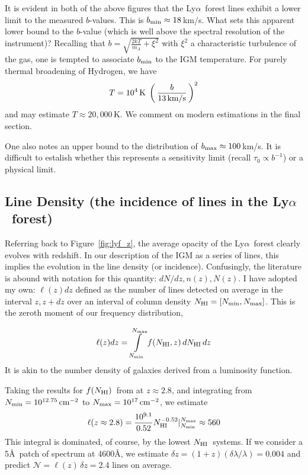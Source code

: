 \documentclass[graybox]{svmult}
\def\lya{Ly$\alpha$}
\def\ltp{\left ( \,}
\def\rtp{\, \right  ) }
\def\intl{\int\limits}
\newcommand{\mnhi}{N_{\rm HI}}
\newcommand{\nhi}{$\mnhi$}
\def\cm#1{\, {\rm cm^{#1}}}
\def\mfnhi{f(\mnhi)}
\def\fnhi{$\mfnhi$}
\begin{document}
It is evident in both of the above figures that the
\lya\ forest lines exhibit a lower limit to the 
measured $b$-values.  This is  $b_{\rm min} \approx 18$\,km/s.
What sets this apparent lower bound to the $b$-value (which is 
well above the spectral resolution of the instrument)?
Recalling that $b = \sqrt{\frac{2kT}{m_A} + \xi^2}$
with $\xi^2$ a characteristic turbulence of the gas,
one is tempted to associate $b_{\rm min}$ to the IGM temperature.
For purely thermal broadening of Hydrogen, we have
\begin{equation}
T = 10^4 \, {\rm K} \; \ltp \frac{b}{13 \, \rm km/s} \rtp^2
\end{equation}
and may estimate $T \approx 20,000$\,K.
We comment on modern estimations in the final section.

One also notes an upper bound to the distribution
of $b_{\rm max} \approx 100$\,km/s.
It is difficult to estalish whether this represents
a sensitivity limit (recall $\tau_0 \propto b^{-1}$)
or a physical limit.

\subsection{Line Density (the incidence of lines in the \lya\ forest)}
Referring back to Figure~\ref{fig:lyf_z}, the average 
opacity of the \lya\ forest clearly evolves with redshift.
In our description of the IGM as a series of lines, this
implies the evolution in the line density (or incidence).
Confusingly, the literature is abound with notation for
this quantity: $dN/dz, n(z), N(z)$.
I have adopted my own:  $\ell(z) dz $ defined as the
number of lines detected on average in the interval 
$z, z+dz$ over an interval of 
column density $\mnhi = [N_{\rm min}, N_{\rm max}]$.
This is the zeroth moment of our frequency distribution,

\begin{equation}
\ell(z) dz = \intl_{N_{\rm min}}^{N_{\rm max}} f(\mnhi,z) \, d\mnhi \, dz
\label{eqn:loz}
\end{equation}
It is akin to the number density of galaxies derived from a 
luminosity function.

Taking the results for \fnhi\ from \cite{kim13} at $z \approx 2.8$,
and integrating from $N_{\rm min} = 10^{12.75} \cm{-2}$
to $N_{\rm max} = 10^{17} \cm{-2}$, we estimate
\begin{equation}
\ell(z \approx 2.8) = \frac{10^{9.1}}{0.52} \mnhi^{-0.52} 
|_{N_{\rm min}}^{N_{\rm max}} \approx 560
\end{equation}
This integral is dominated, of course, by the lowest 
\nhi\ systems.  If we consider a 5\AA\ patch of spectrum at 4600\AA,
we estimate $\delta z = (1+z) (\delta\lambda/\lambda) = 0.004$
and predict $\mathcal{N} = \ell(z) \, \delta z = 2.4$ lines
on average.
\end{document}
